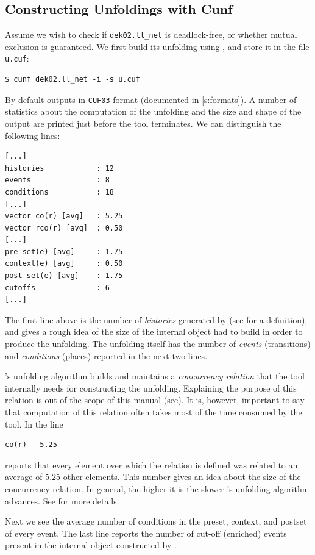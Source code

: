 \documentclass[a4paper]{refart}
\begin{document}
\subsection{Constructing Unfoldings with Cunf}%
\label{s:constructing}

Assume we wish to check if \verb!dek02.ll_net!
is deadlock-free, or whether mutual exclusion is guaranteed.
We first build its unfolding using \cunf,
and store it in the file \verb!u.cuf!:
\begin{verbatim}
$ cunf dek02.ll_net -i -s u.cuf
\end{verbatim}
By default \cunf outputs in \verb!CUF03! format
(documented in \cref{s:formats}).
A number of statistics about the computation of the unfolding
and the size and shape of the output are printed
just before the tool terminates.
We can distinguish the following lines:
\begin{verbatim}
[...]
histories            : 12
events               : 8
conditions           : 18
[...]
vector co(r) [avg]   : 5.25
vector rco(r) [avg]  : 0.50
[...]
pre-set(e) [avg]     : 1.75
context(e) [avg]     : 0.50
post-set(e) [avg]    : 1.75
cutoffs              : 6
[...]
\end{verbatim}
The first line above is the number of \emph{histories} generated by \cunf
(see\cite{BBCKRS12} for a definition), and gives a rough idea
of the size of the internal object \cunf had to build in order to produce the
unfolding.
The unfolding itself has the number of \emph{events} (transitions)
and \emph{conditions} (places)
reported in the next two lines.

\cunf's unfolding algorithm builds and maintains a \emph{concurrency relation}
that the tool internally needs for constructing the unfolding.
Explaining the purpose of this relation is out
of the scope of this manual (see\cite{BBCKRS12}).
It is, however, important to say that computation of this relation often takes
most of the time consumed by the tool.  In the line
\begin{verbatim}
co(r)   5.25
\end{verbatim}
\cunf reports that every element over which the relation is
defined was related to an average of 5.25 other elements.
This number gives an idea about the size of the concurrency relation.
In general, the higher it is the slower \cunf's unfolding algorithm advances.
See \cite[section 7]{BBCKRS12} for more details.

Next we see the average number of conditions in the 
preset, context, and postset of every event.  The last line reports
the number of cut-off (enriched) events present in the internal object
constructed by \cunf.
\end{document}
